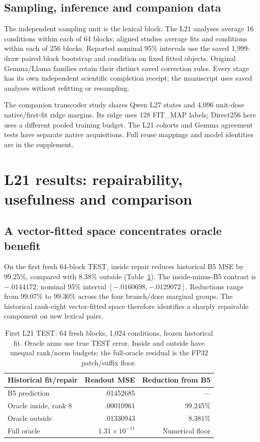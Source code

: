 \documentclass[11pt]{article}
\begin{document}
\subsection{Sampling, inference and companion data}
The independent sampling unit is the lexical block. The L21 analyses average 16 conditions within each of 64 blocks; aligned studies average fits and conditions within each of 256 blocks. Reported nominal 95\% intervals use the saved 1,999-draw paired block bootstrap and condition on fixed fitted objects. Original Gemma/Llama families retain their distinct saved correction rules. Every stage has its own independent scientific completion receipt; the manuscript uses saved analyses without refitting or resampling.

The companion transcoder study shares Qwen L27 states and 4,096 unit-dose native/first-fit ridge margins. Its ridge uses 128 FIT\_MAP labels; Direct256 here uses a different pooled training budget. The L21 cohorts and Gemma agreement tests have separate native acquisitions. Full reuse mappings and model identities are in the supplement.

\section{L21 results: repairability, usefulness and comparison}
\subsection{A vector-fitted space concentrates oracle benefit}
On the first fresh 64-block TEST, inside repair reduces historical B5 MSE by 99.25\%, compared with 8.38\% outside (Table~\ref{tab:oracle}). The inside-minus-B5 contrast is $-.0144172$, nominal 95\% interval $[-.0160698,-.0129072]$. Reductions range from 99.07\% to 99.30\% across the four branch/dose marginal groups. The historical rank-eight vector-fitted space therefore identifies a sharply repairable component on new lexical pairs.

\begin{table}[ht]\centering\small
\begin{tabular}{lrr}\toprule Historical fit/repair & Readout MSE & Reduction from B5\\\midrule
B5 prediction & .01452685 & ---\\
Oracle inside, rank 8 & .00010961 & 99.245\%\\
Oracle outside & .01330943 & 8.381\%\\
Full oracle & $1.31\times10^{-11}$ & Numerical floor\\\bottomrule\end{tabular}
\caption{First L21 TEST: 64 fresh blocks, 1,024 conditions, frozen historical fit. Oracle arms use true TEST error. Inside and outside have unequal rank/norm budgets; the full-oracle residual is the FP32 patch/suffix floor.}\label{tab:oracle}
\end{table}
\end{document}
